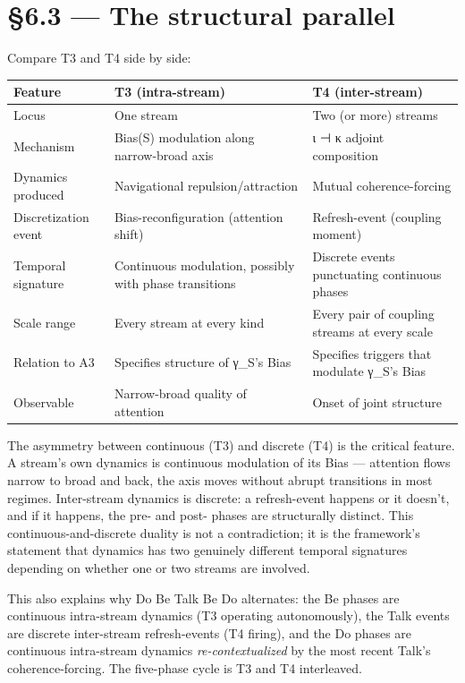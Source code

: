 \documentclass[11pt, openany]{book}
\newcommand{\sectionbreak}{\clearpage}
\begin{document}
\sectionbreak

\section{§6.3 --- The structural parallel}

Compare T3 and T4 side by side:

\begingroup\setlength{\tabcolsep}{3pt}\renewcommand{\arraystretch}{1.15}\footnotesize
\begin{center}
\begin{tabular}{p{0.73in} p{1.97in} p{1.64in}}
\toprule
Feature & T3 (intra-stream) & T4 (inter-stream) \\
\midrule
Locus & One stream & Two (or more) streams \\
Mechanism & Bias(S) modulation along narrow-broad axis & ι ⊣ κ adjoint composition \\
Dynamics produced & Navigational repulsion/\allowbreak attraction & Mutual coherence-forcing \\
Discretization event & Bias-reconfiguration (attention shift) & Refresh-event (coupling moment) \\
Temporal signature & Continuous modulation, possibly with phase transitions & Discrete events punctuating continuous phases \\
Scale range & Every stream at every kind & Every pair of coupling streams at every scale \\
Relation to A3 & Specifies structure of γ\_\allowbreak{}S's Bias & Specifies triggers that modulate γ\_\allowbreak{}S's Bias \\
Observable & Narrow-broad quality of attention & Onset of joint structure \\
\bottomrule
\end{tabular}
\end{center}
\endgroup
The asymmetry between continuous (T3) and discrete (T4) is the critical feature. A stream's own dynamics is continuous modulation of its Bias --- attention flows narrow to broad and back, the axis moves without abrupt transitions in most regimes. Inter-stream dynamics is discrete: a refresh-event happens or it doesn't, and if it happens, the pre- and post- phases are structurally distinct. This continuous-and-discrete duality is not a contradiction; it is the framework's statement that dynamics has two genuinely different temporal signatures depending on whether one or two streams are involved.

This also explains why Do Be Talk Be Do alternates: the Be phases are continuous intra-stream dynamics (T3 operating autonomously), the Talk events are discrete inter-stream refresh-events (T4 firing), and the Do phases are continuous intra-stream dynamics \textit{re-contextualized} by the most recent Talk's coherence-forcing. The five-phase cycle is T3 and T4 interleaved.
\end{document}
